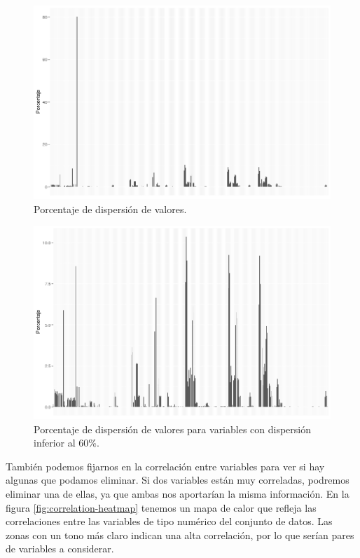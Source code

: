 \begin{figure}
    \includegraphics[width=\textwidth]{images/exploration/dispersity-barplot.png}
    \caption{Porcentaje de dispersión de valores.}
    \label{fig:dispersity-barplot}
\end{figure}

\begin{figure}
    \includegraphics[width=\textwidth]{images/exploration/dispersity-reduced-barplot.png}
    \caption{Porcentaje de dispersión de valores para variables con dispersión inferior al 60\%.}
    \label{fig:dispersity-reduced-barplot}
\end{figure}

También podemos fijarnos en la correlación entre variables para ver si hay
algunas que podamos eliminar. Si dos variables están muy correladas, podremos
eliminar una de ellas, ya que ambas nos aportarían la misma información. En la
figura \ref{fig:correlation-heatmap} tenemos un mapa de calor que refleja las
correlaciones entre las variables de tipo numérico del conjunto de datos. Las
zonas con un tono más claro indican una alta correlación, por lo que serían
pares de variables a considerar.


